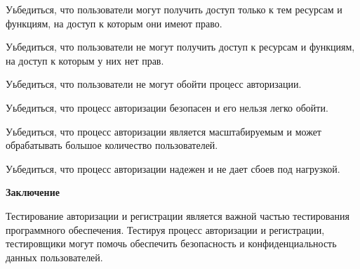 \begin{compactitem}

    \item    Уьбедиться, что пользователи могут получить доступ только к тем ресурсам и функциям, на доступ к которым они имеют право.
    \item    Уьбедиться, что пользователи не могут получить доступ к ресурсам и функциям, на доступ к которым у них нет прав.
    \item    Уьбедиться, что пользователи не могут обойти процесс авторизации.
    \item    Уьбедиться, что процесс авторизации безопасен и его нельзя легко обойти.
    \item    Уьбедиться, что процесс авторизации является масштабируемым и может обрабатывать большое количество пользователей.
    \item    Уьбедиться, что процесс авторизации надежен и не дает сбоев под нагрузкой.

\end{compactitem}

\textbf{Заключение}

Тестирование авторизации и регистрации является важной частью тестирования программного обеспечения. Тестируя процесс авторизации и регистрации, тестировщики могут помочь обеспечить безопасность и конфиденциальность данных пользователей.




